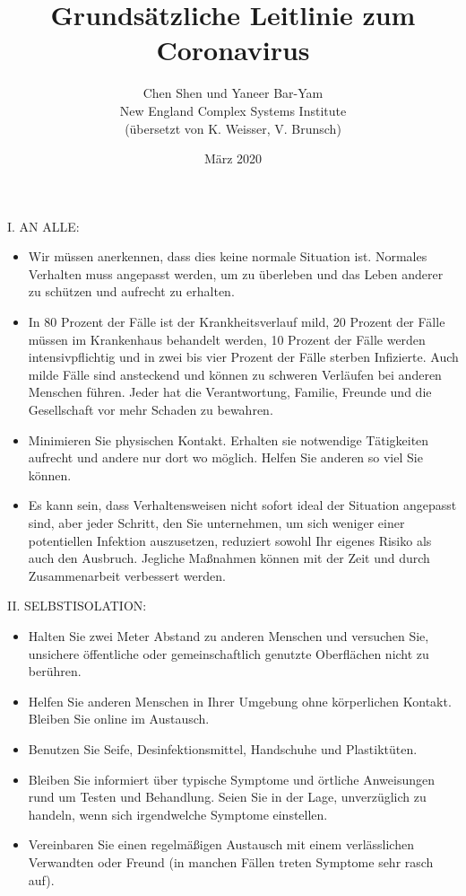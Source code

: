 \documentclass{article}
\title{Grundsätzliche Leitlinie zum Coronavirus}
\author{Chen Shen und Yaneer Bar-Yam \\ New England Complex Systems Institute \\ (übersetzt von K. Weisser, V. Brunsch)}
\date{März 2020}
\begin{document}
\maketitle


\begin{center}I. AN ALLE:\end{center}
\begin{itemize}
\item Wir müssen anerkennen, dass dies keine normale Situation ist. Normales Verhalten muss angepasst werden, um zu überleben und das Leben anderer zu schützen und aufrecht zu erhalten.
\item In 80 Prozent der Fälle ist der Krankheitsverlauf mild, 20 Prozent der Fälle müssen im Krankenhaus behandelt werden, 10 Prozent der Fälle werden intensivpflichtig und in zwei bis vier Prozent der Fälle sterben Infizierte. Auch milde Fälle sind ansteckend und können zu schweren Verläufen bei anderen Menschen führen. Jeder hat die Verantwortung, Familie, Freunde und die Gesellschaft vor mehr Schaden zu bewahren.
\item Minimieren Sie physischen Kontakt. Erhalten sie notwendige Tätigkeiten aufrecht und andere nur dort wo möglich. Helfen Sie anderen so viel Sie können.
\item Es kann sein, dass Verhaltensweisen nicht sofort ideal der Situation angepasst sind, aber jeder Schritt, den Sie unternehmen, um sich weniger einer potentiellen Infektion auszusetzen, reduziert sowohl Ihr eigenes Risiko als auch den Ausbruch. Jegliche Maßnahmen können mit der Zeit und durch Zusammenarbeit verbessert werden.
\end{itemize}




\begin{center}II. SELBSTISOLATION:\end{center}
\begin{itemize}
\item Halten Sie zwei Meter Abstand zu anderen Menschen und versuchen Sie, unsichere öffentliche oder gemeinschaftlich genutzte Oberflächen nicht zu berühren.
\item Helfen Sie anderen Menschen in Ihrer Umgebung ohne körperlichen Kontakt. Bleiben Sie online im Austausch.
\item Benutzen Sie Seife, Desinfektionsmittel, Handschuhe und Plastiktüten.
\item Bleiben Sie informiert über typische Symptome und örtliche Anweisungen rund um Testen und Behandlung. Seien Sie in der Lage, unverzüglich zu handeln, wenn sich irgendwelche Symptome einstellen.
\item Vereinbaren Sie einen regelmäßigen Austausch mit einem verlässlichen Verwandten oder Freund (in manchen Fällen treten Symptome sehr rasch auf).
\end{itemize}
\end{document}
